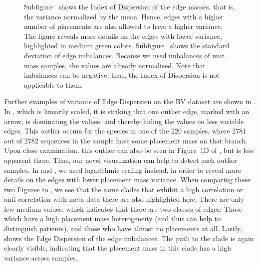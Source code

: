 \begin{figure}[!htpb]
{%
        Subfigure~
        shows the Index of Dispersion of the edge masses, that is, the variance normalized by the mean.
        Hence, edges with a higher number of placements are also allowed to have a higher variance.
        The figure reveals more details on the edges with lower variance, highlighted in medium green colors.
        Subfigure~
        shows the standard deviation of edge imbalances.
        Because we used imbalances of unit mass samples, the values are already normalized.
        Note that imbalances can be negative; thus, the Index of Dispersion is not applicable to them.
    }
    \label{fig:all_dispersions}
\end{figure}


Further examples of variants of Edge Dispersion on the \ac{BV} dataset are shown in .
In , which is linearily scaled,
it is striking that one outlier edge, marked with an arrow, is dominating the values,
and thereby hiding the values on less variable edges.
This outlier occurs for the species  in one of the \num{220} samples,
where \num{2 781} out of \num{2 782} sequences in the sample have some placement mass on that branch.
Upon close examination, this outlier can also be seen in Figure~1D of ,
but is less apparent there.
Thus, our novel visualization can help to detect such outlier samples.
In  and ,
we used logarithmic scaling instead, in order to reveal more details on the edges with lower placement mass variance.
When comparing these two Figures to ,
we see that the same clades that exhibit a high correlation or anti-correlation with meta-data there
are also highlighted here.
There are only few medium values, which indicates that there are two classes of edges:
Those which have a high placement mass heterogeneity (and thus can help to distinguish patients),
and those who have almost no placements at all.
Lastly,  shows the Edge Dispersion of the edge imbalances.
The path to the  clade is again clearly visible,
indicating that the placement mass in this clade has a high variance across samples.

